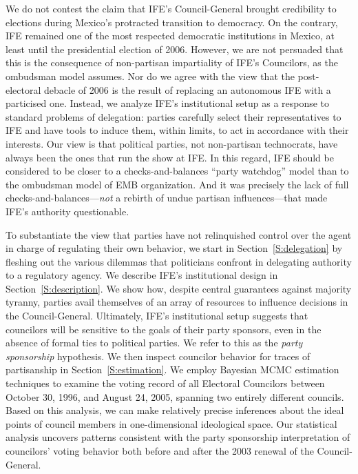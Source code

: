 \documentclass[12 pt, letter]{article}
\begin{document}
We do not contest the claim that IFE's Council-General brought credibility to elections during Mexico's protracted transition to democracy.  On the contrary, IFE remained one of the most respected democratic institutions in Mexico, at least until the presidential election of 2006.  However, we are not persuaded that this is the consequence of non-partisan impartiality of IFE's Councilors, as the ombudsman model assumes.    Nor do we agree with the view that the  post-electoral debacle of 2006 is the result of replacing an autonomous IFE with a particised one. Instead, we analyze IFE's institutional setup as a response to standard problems of delegation: parties carefully select their representatives to IFE and have tools to induce them, within limits, to act in accordance with their interests. Our view is that political parties, not non-partisan technocrats, have always been the ones that run the show at IFE.  In this regard, IFE should be considered to be closer to a checks-and-balances ``party watchdog'' model than to the ombudsman model of EMB organization.  And it was precisely the lack of full checks-and-balances---\emph{not} a rebirth of undue partisan influences---that made IFE's authority questionable.

To substantiate the view that parties have not relinquished control over the agent in charge of regulating their own behavior, we start in Section~\ref{S:delegation} by fleshing out the various dilemmas that politicians confront in delegating authority to a regulatory agency. We describe IFE's institutional design in Section~\ref{S:description}.  We show how, despite central guarantees against majority tyranny, parties avail themselves of an array of resources to influence decisions in the Council-General. Ultimately, IFE's institutional setup suggests that councilors will be sensitive to the goals of their party sponsors, even in the absence of formal ties to political parties.  We refer to this as the \emph{party sponsorship} hypothesis.  We then inspect councilor behavior for traces of partisanship in Section~\ref{S:estimation}. We employ Bayesian MCMC estimation techniques to examine the voting record of all Electoral Councilors between October 30, 1996, and August 24, 2005, spanning two entirely different councils.  Based on this analysis, we can make relatively precise inferences about the ideal points of council members in one-dimensional ideological space.  Our statistical analysis uncovers patterns consistent with the party sponsorship interpretation of councilors' voting behavior both before and after the 2003 renewal of the Council-General.
\end{document}
